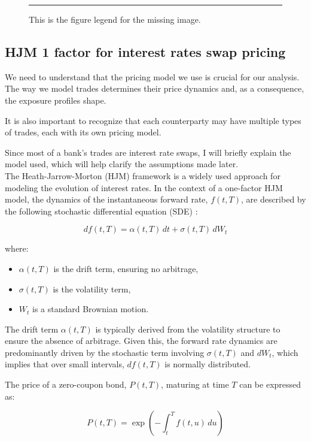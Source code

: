\documentclass{article}
\begin{document}
\begin{figure}[H]
    \centering
    \rule{0.8\textwidth}{0.35\textheight} %
    \caption{This is the figure legend for the missing image.}
\end{figure}

\subsection{HJM 1 factor for interest rates swap pricing}

We need to understand that the pricing model we use is crucial for our analysis. The way we model trades determines their price dynamics and, as a consequence, the exposure profiles shape.

It is also important to recognize that each counterparty may have multiple types of trades, each with its own pricing model.

Since most of a bank's trades are interest rate swaps, I will briefly explain the model used, which will help clarify the assumptions made later.\\


The Heath-Jarrow-Morton (HJM) framework is a widely used approach for modeling the evolution of interest rates. In the context of a one-factor HJM model, the dynamics of the instantaneous forward rate, \(f(t,T)\), are described by the following stochastic differential equation (SDE) \cite{shreve2004stochastic}:

\[
df(t,T) = \alpha(t,T) \, dt + \sigma(t,T) \, dW_t
\]

where:
\begin{itemize}
    \item \(\alpha(t,T)\) is the drift term, ensuring no arbitrage,
    \item \(\sigma(t,T)\) is the volatility term,
    \item \(W_t\) is a standard Brownian motion.
\end{itemize}

The drift term \(\alpha(t,T)\) is typically derived from the volatility structure to ensure the absence of arbitrage. Given this, the forward rate dynamics are predominantly driven by the stochastic term involving \(\sigma(t,T)\) and \(dW_t\), which implies that over small intervals, \(df(t,T)\) is normally distributed.

The price of a zero-coupon bond, \(P(t,T)\), maturing at time \(T\) can be expressed as:

\[
P(t,T) = \exp\left(-\int_t^T f(t,u) \, du\right)
\]
\end{document}

